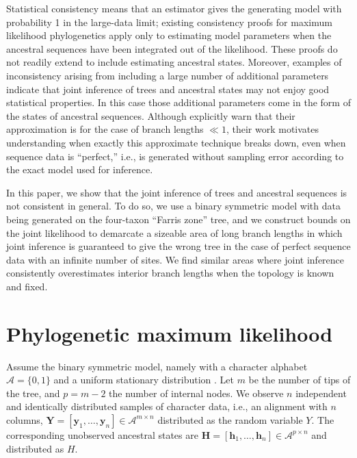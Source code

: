 \documentclass{article}
\newcommand{\alphabet}{\mathcal{A}}
\newcommand{\fullAlignment}{\mathbf{Y}}
\newcommand{\alignmentColumn}{\mathbf{y}}
\newcommand{\alignmentColumnRV}{Y}
\newcommand{\fullAncestralStates}{\mathbf{H}}
\newcommand{\ancestralStateColumn}{\mathbf{h}}
\newcommand{\ancestralStateColumnRV}{H}
\newcommand{\nCols}{n}
\newcommand{\nSiteRows}{m}
\newcommand{\nAncestralStateRows}{p}
\begin{document}
Statistical consistency means that an estimator gives the generating model with probability 1 in the large-data limit; existing consistency proofs for maximum likelihood phylogenetics \cite{RoyChoudhury2015-ta} apply only to estimating model parameters when the ancestral sequences have been integrated out of the likelihood.
These proofs do not readily extend to include estimating ancestral states.
Moreover, examples of inconsistency arising from including a large number of additional parameters \cite{Neyman1948-tt} indicate that joint inference of trees and ancestral states may not enjoy good statistical properties.
In this case those additional parameters come in the form of the states of ancestral sequences.
Although \cite{Sagulenko2017-jo} explicitly warn that their approximation is for the case of branch lengths $\ll 1$, their work motivates understanding when exactly this approximate technique breaks down, even when sequence data is ``perfect,'' i.e., is generated without sampling error according to the exact model used for inference.

In this paper, we show that the joint inference of trees and ancestral sequences is not consistent in general.
To do so, we use a binary symmetric model with data being generated on the four-taxon ``Farris zone'' \cite{Siddall1998-hq} tree, and we construct bounds on the joint likelihood to demarcate a sizeable area of long branch lengths in which joint inference is guaranteed to give the wrong tree in the case of perfect sequence data with an infinite number of sites.
We find similar areas where joint inference consistently overestimates interior branch lengths when the topology is known and fixed.

\section*{Phylogenetic maximum likelihood}

Assume the binary symmetric model, namely with a character alphabet $\alphabet=\{0,1\}$ and a uniform stationary distribution \cite{Semple2003-em}.
Let $\nSiteRows$ be the number of tips of the tree, and $\nAncestralStateRows = \nSiteRows-2$ the number of internal nodes.
We observe $\nCols$ independent and identically distributed samples of character data, i.e., an alignment with $\nCols$ columns, $\fullAlignment=[\alignmentColumn_1,\ldots,\alignmentColumn_\nCols]\in\alphabet^{\nSiteRows\times\nCols}$ distributed as the random variable $\alignmentColumnRV$.
The corresponding unobserved ancestral states are $\fullAncestralStates=[\ancestralStateColumn_1,\ldots,\ancestralStateColumn_\nCols]\in\alphabet^{\nAncestralStateRows\times\nCols}$ and distributed as $\ancestralStateColumnRV$.
\end{document}
